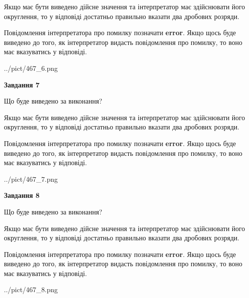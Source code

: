 \documentclass[12pt, ukrainian]{article}
\begin{document}
{\begin {Large}
Якщо має бути виведено дійсне значення та інтерпретатор має здійснювати його округлення, 
то у відповіді достатньо правильно вказати два дробових розряди.

Повідомлення інтерпретатора про помилку позначати \textbf{error}.
Якщо щось буде виведено до того, як інтерпретатор видасть повідомлення про помилку, 
то воно має вказуватись у відповіді. \par

\begin{center}
	{../pict/467_6.png}
\end{center}
\newpage

{\begin {center}\textbf{Завдання 7}\end {center}}\par
Що буде виведено за виконання? \par

Якщо має бути виведено дійсне значення та інтерпретатор має здійснювати його округлення, 
то у відповіді достатньо правильно вказати два дробових розряди.

Повідомлення інтерпретатора про помилку позначати \textbf{error}.
Якщо щось буде виведено до того, як інтерпретатор видасть повідомлення про помилку, 
то воно має вказуватись у відповіді. \par

\begin{center}
	{../pict/467_7.png}
\end{center}
\newpage

{\begin {center}\textbf{Завдання 8}\end {center}}\par
Що буде виведено за виконання? \par

Якщо має бути виведено дійсне значення та інтерпретатор має здійснювати його округлення, 
то у відповіді достатньо правильно вказати два дробових розряди.

Повідомлення інтерпретатора про помилку позначати \textbf{error}.
Якщо щось буде виведено до того, як інтерпретатор видасть повідомлення про помилку, 
то воно має вказуватись у відповіді. \par

\begin{center}
	{../pict/467_8.png}
\end{center}
\newpage


\end{Large}}
\end{document}
